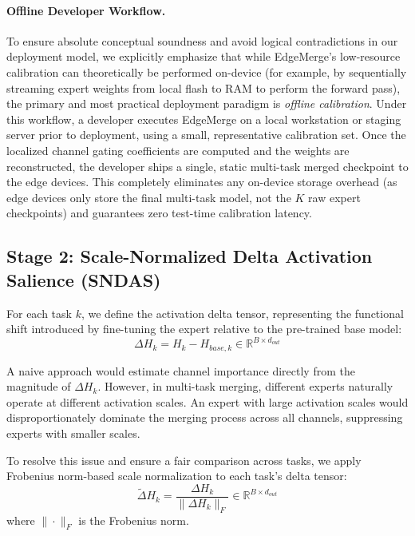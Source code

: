 \paragraph{Offline Developer Workflow.}
To ensure absolute conceptual soundness and avoid logical contradictions in our deployment model, we explicitly emphasize that while EdgeMerge's low-resource calibration can theoretically be performed on-device (for example, by sequentially streaming expert weights from local flash to RAM to perform the forward pass), the primary and most practical deployment paradigm is \emph{offline calibration}. Under this workflow, a developer executes EdgeMerge on a local workstation or staging server prior to deployment, using a small, representative calibration set. Once the localized channel gating coefficients are computed and the weights are reconstructed, the developer ships a single, static multi-task merged checkpoint to the edge devices. This completely eliminates any on-device storage overhead (as edge devices only store the final multi-task model, not the $K$ raw expert checkpoints) and guarantees zero test-time calibration latency.

\subsection{Stage 2: Scale-Normalized Delta Activation Salience (SNDAS)}
For each task $k$, we define the activation delta tensor, representing the functional shift introduced by fine-tuning the expert relative to the pre-trained base model:
\begin{equation}
\Delta H_k = H_{k} - H_{base, k} \in \mathbb{R}^{B \times d_{out}}
\end{equation}

A naive approach would estimate channel importance directly from the magnitude of $\Delta H_k$. However, in multi-task merging, different experts naturally operate at different activation scales. An expert with large activation scales would disproportionately dominate the merging process across all channels, suppressing experts with smaller scales.

To resolve this issue and ensure a fair comparison across tasks, we apply Frobenius norm-based scale normalization to each task's delta tensor:
\begin{equation}
\tilde{\Delta} H_k = \frac{\Delta H_k}{\|\Delta H_k\|_F} \in \mathbb{R}^{B \times d_{out}}
\end{equation}
where $\|\cdot\|_F$ is the Frobenius norm.

